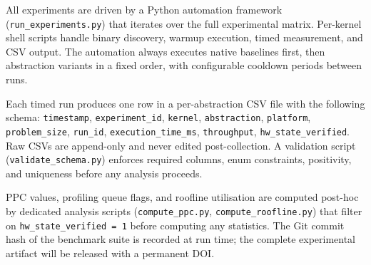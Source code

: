 All experiments are driven by a Python automation framework
(\texttt{run\_experiments.py}) that iterates over the full experimental matrix.
Per-kernel shell scripts handle binary discovery, warmup execution, timed
measurement, and CSV output. The automation always executes native baselines
first, then abstraction variants in a fixed order, with configurable cooldown
periods between runs.

Each timed run produces one row in a per-abstraction CSV file with the
following schema: \texttt{timestamp}, \texttt{experiment\_id}, \texttt{kernel},
\texttt{abstraction}, \texttt{platform}, \texttt{problem\_size},
\texttt{run\_id}, \texttt{execution\_time\_ms}, \texttt{throughput},
\texttt{hw\_state\_verified}. Raw CSVs are append-only and never edited
post-collection. A validation script (\texttt{validate\_schema.py}) enforces
required columns, enum constraints, positivity, and uniqueness before any
analysis proceeds.

PPC values, profiling queue flags, and roofline utilisation are computed
post-hoc by dedicated analysis scripts (\texttt{compute\_ppc.py},
\texttt{compute\_roofline.py}) that filter on
\texttt{hw\_state\_verified = 1} before computing any statistics. The Git
commit hash of the benchmark suite is recorded at run time; the complete
experimental artifact will be released with a permanent DOI.
